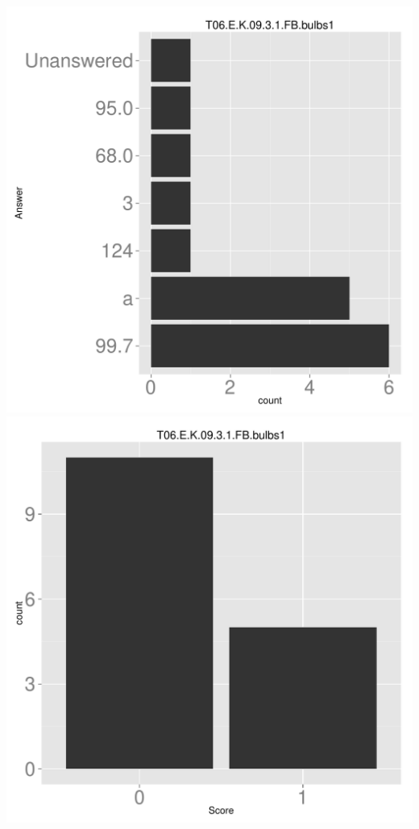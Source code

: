 \documentclass[12pt,english,nohyper]{tufte-handout}\usepackage[]{graphicx}\usepackage[]{color}
\begin{document}
\begin{center} \includegraphics[width=.45\linewidth]{Topic06_AB_33_answer} \includegraphics[width=.45\linewidth]{Topic06_AB_33_score} \end{center} 
\end{document}
